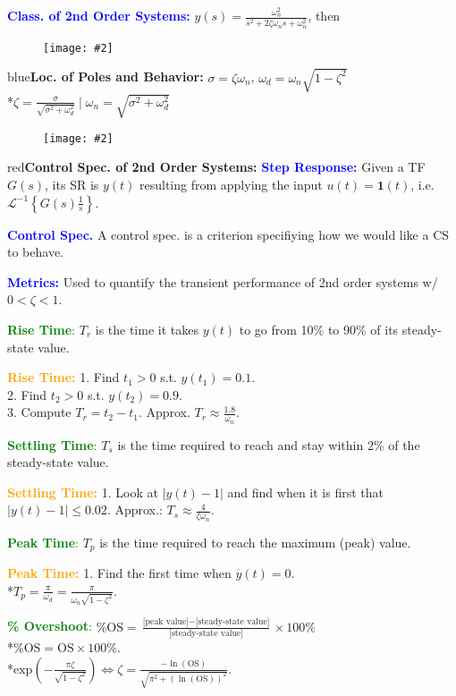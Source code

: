 \documentclass[5pt]{extarticle} %
\newcommand{\customFigure}[3][]{%
    \vspace{-1.5em}
    \begin{figure}[H]
        \centering
        \texttt{[image: \#2]}
    \end{figure}
    \vspace{-1.5em}
}
\begin{document}
\begin{paracol}{3}
{    \textcolor{blue}{\textbf{Class. of 2nd Order Systems:}} $y(s) = \frac{\omega_n^2}{s^2 + 2\zeta\omega_n s + \omega_n^2}$, then \\
    \customFigure[0.2]{../Images/L10_1.png}

    \textcolor{blue}{\textbf{Loc. of Poles and Behavior:}} $\sigma = \zeta \omega_n$, $\omega_d = \omega_n \sqrt{1 - \zeta^2}$ \\
    *$\zeta = \frac{\sigma}{\sqrt{\sigma^2 + \omega_d^2}} \mid \omega_n = \sqrt{\sigma^2 + \omega_d^2}$ \\
    \customFigure[0.2]{../Images/L10_2.png}

    \textcolor{red}{\textbf{Control Spec. of 2nd Order Systems:}} \textcolor{blue}{\textbf{Step Response:}} Given a TF $G(s)$, its SR is $y(t)$ resulting from applying the input $u(t) = \mathbf{1}(t)$, i.e. $\mathcal{L}^{-1} \left\{G(s) \frac{1}{s} \right\}$.

    \textcolor{blue}{\textbf{Control Spec.}} A control spec. is a criterion specifiying how we would like a CS to behave. 

    \textcolor{blue}{\textbf{Metrics:}} Used to quantify the transient performance of 2nd order systems w/ $0 < \zeta < 1$.

    \textcolor{green}{\textbf{Rise Time}:} $T_r$ is the time it takes $y(t)$ to go from 10\% to 90\% of its steady-state value.

    \textcolor{orange}{\textbf{Rise Time:}} 1. Find $t_1 > 0$ s.t. $y(t_1) = 0.1$. \\ 
    2. Find $t_2 > 0$ s.t. $y(t_2) = 0.9$. \\
    3. Compute $T_r = t_2 - t_1$. Approx. $T_r \approx \frac{1.8}{\omega_n}$. 

    \textcolor{green}{\textbf{Settling Time}:} $T_s$ is the time required to reach and stay within 2\% of the steady-state value.

    \textcolor{orange}{\textbf{Settling Time:}} 1. Look at $|y(t) - 1|$ and find when it is first that $|y(t) - 1| \leq 0.02$. Approx.: $T_s \approx \frac{4}{\zeta \omega_n}$.

    \textcolor{green}{\textbf{Peak Time}:} $T_p$ is the time required to reach the maximum (peak) value.

    \textcolor{orange}{\textbf{Peak Time:}} 1. Find the first time when $\overset{\cdot}{y}(t) = 0$. \\
    *$T_p = \frac{\pi}{\omega_d} = \frac{\pi}{\omega_n \sqrt{1 - \zeta^2}}$.

    \textcolor{green}{\textbf{\% Overshoot}:} $\% \text{OS} = \frac{\text{[peak value]} - \text{[steady-state value]}}{\text{[steady-state value]}} \times 100\%$ \\
    *$\text{\% OS} = \text{OS} \times 100 \%$. \\
    *$\text{exp}\left(-\frac{\pi \zeta}{\sqrt{1-\zeta^2}}\right) \iff \zeta = \frac{-\ln(\text{OS})}{\sqrt{\pi^2 + (\ln(\text{OS}))^2}}$.

}
\end{paracol}
\end{document}
